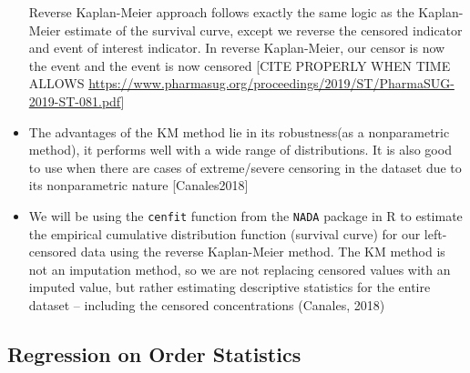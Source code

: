 \documentclass[12pt, twoside]{amherstthesis}
\begin{document}
\begin{itemize}
  Reverse Kaplan-Meier approach follows exactly the same logic as the Kaplan-Meier estimate of the survival curve, except we reverse the censored indicator and event of interest indicator. In reverse Kaplan-Meier, our censor is now the event and the event is now censored {[}CITE PROPERLY WHEN TIME ALLOWS \url{https://www.pharmasug.org/proceedings/2019/ST/PharmaSUG-2019-ST-081.pdf}{]}
\item
  The advantages of the KM method lie in its robustness(as a nonparametric method), it performs well with a wide range of distributions. It is also good to use when there are cases of extreme/severe censoring in the dataset due to its nonparametric nature {[}Canales2018{]}
\item
  We will be using the \texttt{cenfit} function from the \texttt{NADA} package in R to estimate the empirical cumulative distribution function (survival curve) for our left-censored data using the reverse Kaplan-Meier method. The KM method is not an imputation method, so we are not replacing censored values with an imputed value, but rather estimating descriptive statistics for the entire dataset -- including the censored concentrations (Canales, 2018)
\end{itemize}
\hypertarget{ROS}{%
\subsection{Regression on Order Statistics}\label{ROS}}
\end{document}
